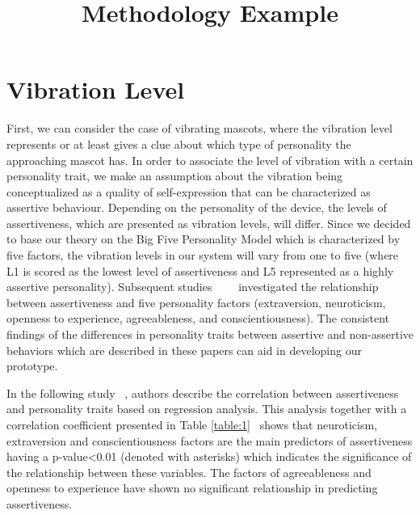 \documentclass[12pt]{article}
\title{Methodology Example}
\begin{document}
\maketitle

\section{Vibration Level} 
First, we can consider the case of vibrating mascots, where the vibration level represents or at least gives a clue about which type of personality the approaching mascot has.
In order to associate the level of vibration with a certain personality trait, we make an assumption about the vibration being conceptualized as a quality of self-expression that can be characterized as assertive behaviour. Depending on the personality of the device, the levels of assertiveness, which are presented as vibration levels, will differ. Since we decided to base our theory on the Big Five Personality Model which is characterized by five factors, the vibration levels in our system will vary from one to five (where L1 is scored as the lowest level of assertiveness and L5 represented as a highly assertive personality). Subsequent studies~\cite{bagherianrelationship}~\cite{kirst2011investigating}~\cite{ramanaiah1993neo}~\cite{lefevre1981assertiveness} investigated the relationship between assertiveness and five personality factors (extraversion, neuroticism, openness to experience, agreeableness, and conscientiousness). The consistent findings of the differences in personality traits between assertive and non-assertive behaviors which are described in these papers can aid in developing our prototype. 

\par In the following study ~\cite{bagherianrelationship}, authors describe the correlation between assertiveness and personality traits based on regression analysis. This analysis together with a correlation coefficient presented in Table \ref{table:1}~\cite{bagherianrelationship} shows that neuroticism, extraversion and conscientiousness factors are the main predictors of assertiveness having a p-value\textless 0.01 (denoted with asterisks) which indicates the significance of the relationship between these variables. The factors of agreeableness and openness to experience have shown no significant relationship in predicting assertiveness. 
\end{document}
